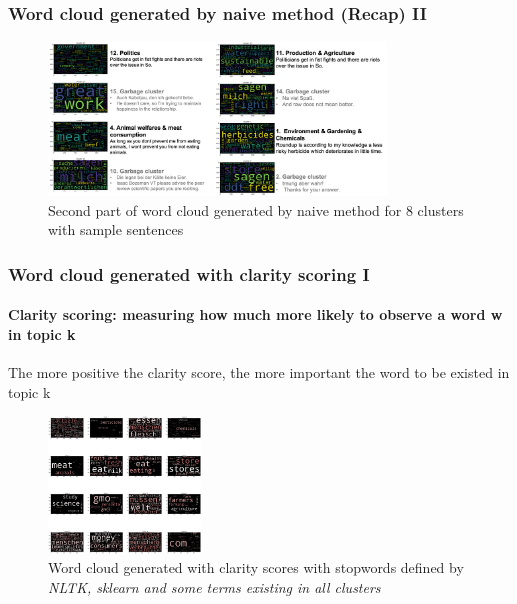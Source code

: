 \documentclass{tum-presentation}
\begin{document}
\begin{frame}
  \frametitle{Word cloud generated by naive method (Recap) II}
  \begin{center}
    \begin{figure}[t]
      \includegraphics[width=0.8\textwidth]{figures/example16_2.png}
      \caption{Second part of word cloud generated by naive method for 8 clusters with sample sentences}
    \end{figure}
  \end{center}
\end{frame}

\begin{frame}
  \frametitle{Word cloud generated with clarity scoring I}
  \framesubtitle{Clarity scoring: measuring how much more likely to observe a word w in topic k}
  The more positive the clarity score, the more important the word to be existed in topic k \\
  \begin{center}
    \begin{figure}[t]
      \includegraphics[width=0.36\textwidth]{images/nltk_sklearn_wordcloud.png}
      \caption{Word cloud generated with clarity scores with stopwords defined by \emph{NLTK, sklearn and some terms existing in all clusters}}
    \end{figure}
  \end{center}
\end{frame}
\end{document}
